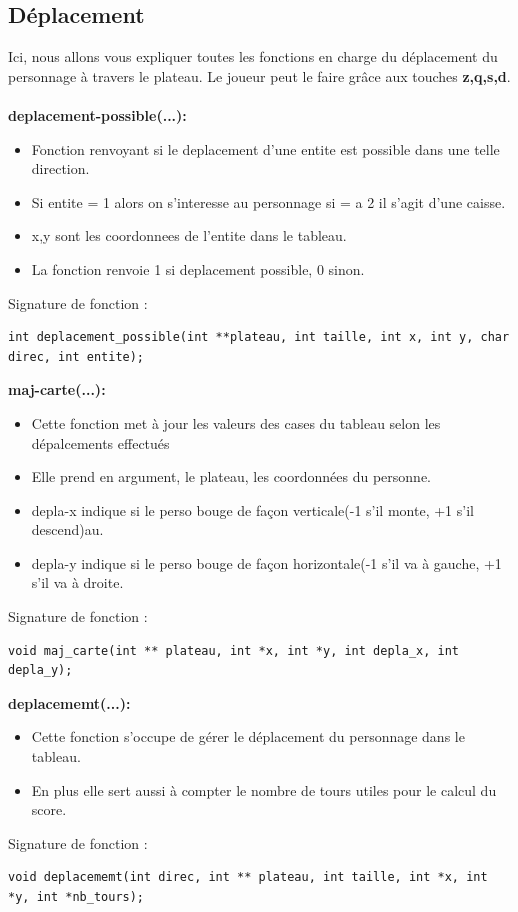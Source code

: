 \documentclass{article}
\begin{document}
\subsection{Déplacement}
Ici, nous allons vous expliquer toutes les fonctions en charge du déplacement du personnage à travers le plateau. Le joueur peut le faire grâce aux touches \textbf{z,q,s,d}.\\\\
\textbf{deplacement-possible(...):}
\begin{itemize}
\item Fonction renvoyant si le deplacement d'une entite est possible dans une telle direction.
\item Si entite = 1 alors on s'interesse au personnage si = a 2 il s'agit d'une caisse.
\item x,y sont les coordonnees de l'entite dans le tableau.
\item La fonction renvoie 1 si deplacement possible, 0 sinon.
\end{itemize}
Signature de fonction :
\begin{lstlisting}
int deplacement_possible(int **plateau, int taille, int x, int y, char direc, int entite);
\end{lstlisting}
\textbf{maj-carte(...):}
\begin{itemize}
\item Cette fonction met à jour les valeurs des cases du tableau selon les dépalcements effectués
\item Elle prend en argument, le plateau, les coordonnées du personne.
\item depla-x indique si le perso bouge de façon verticale(-1 s'il monte, +1 s'il descend)au.
\item depla-y indique si le perso bouge de façon horizontale(-1 s'il va à gauche, +1 s'il va à droite.
\end{itemize}
Signature de fonction :
\begin{lstlisting}
void maj_carte(int ** plateau, int *x, int *y, int depla_x, int depla_y);
\end{lstlisting}
\textbf{deplacememt(...):}
\begin{itemize}
\item Cette fonction s'occupe de gérer le déplacement du personnage dans le tableau.
\item En plus elle sert aussi à compter le nombre de tours utiles pour le calcul du score.
\end{itemize}
Signature de fonction :
\begin{lstlisting}
void deplacememt(int direc, int ** plateau, int taille, int *x, int *y, int *nb_tours);
\end{lstlisting}
\end{document}
